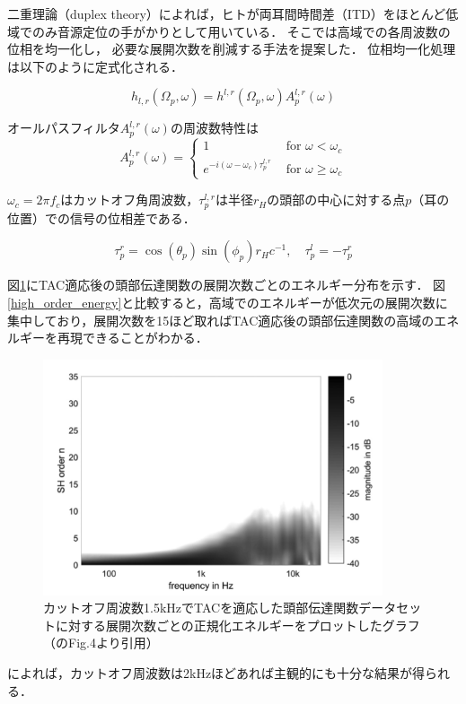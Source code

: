 \documentclass[a4paper]{jsarticle}
\begin{document}
二重理論（duplex theory）によれば，ヒトが両耳間時間差（ITD）をほとんど低域でのみ音源定位の手がかりとして用いている\cite{roginska2017immersive}．
そこで\citeauthor{Zaunschirm2018-mn}\cite{Zaunschirm2018-mn}は高域での各周波数の位相を均一化し，
必要な展開次数を削減する手法を提案した．
位相均一化処理は以下のように定式化される．

$$
    h_{l, r}\left(\Omega_{p}, \omega\right)=h^{l, r}\left(\Omega_{p}, \omega\right) A_{p}^{l, r}(\omega)
$$

オールパスフィルタ$A_{p}^{l, r}(\omega)$の周波数特性は
$$
    A_{p}^{l, r}(\omega)=\left\{\begin{array}{ll}
        1                                                    & \text { for } \omega<\omega_{c}      \\
        e^{-i\left(\omega-\omega_{c}\right) \tau_{p}^{l, r}} & \text { for } \omega \geq \omega_{c}
    \end{array}\right.
$$

$\omega_c=2\pi f_c$はカットオフ角周波数，$\tau_{p}^{l, r}$は半径$r_H$の頭部の中心に対する点$p$（耳の位置）での信号の位相差である．

$$
    \tau_{p}^{r}=\cos \left(\theta_{p}\right) \sin \left(\phi_{p}\right) r_{H} c^{-1}, \quad \tau_{p}^{l}=-\tau_{p}^{r}
$$

図\ref{high_order_energy_improved}にTAC適応後の頭部伝達関数の展開次数ごとのエネルギー分布を示す．
図\ref{high_order_energy}と比較すると，高域でのエネルギーが低次元の展開次数に集中しており，展開次数を15ほど取ればTAC適応後の頭部伝達関数の高域のエネルギーを再現できることがわかる．

\begin{figure}[H]
    \centering
    \includegraphics[clip,width=10cm]{./high_order_energy_improved.png}
    \caption{カットオフ周波数1.5kHzでTACを適応した頭部伝達関数データセットに対する展開次数ごとの正規化エネルギーをプロットしたグラフ（\cite{Zaunschirm2018-mn}のFig.4より引用）}
    \label{high_order_energy_improved}
\end{figure}
\cite{Schorkhuber2018-ql}によれば，カットオフ周波数は2kHzほどあれば主観的にも十分な結果が得られる．
\end{document}
